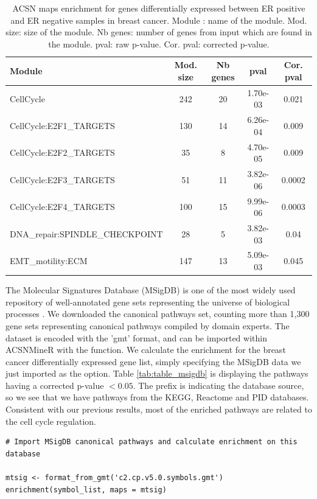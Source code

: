 \documentclass[article]{jss}
\begin{document}
\begin{table}[h!]
  \centering
  \caption{ACSN maps enrichment for genes differentially expressed between ER
positive and ER negative samples in breast cancer.  Module : name of the
module. Mod. size: size of the module. Nb genes: number of genes from input
which are found in the module. pval: raw p-value. Cor. pval: corrected p-value.}
\label{tab:table_mainz}

\begin{tabular}{l|c|c|c|c}
\hline
Module & Mod. size & Nb genes & pval & Cor. pval\\
\hline
CellCycle & 242 & 20 & 1.70e-03 & 0.021 \\
CellCycle:E2F1\_TARGETS & 130 & 14 & 6.26e-04 & 0.009 \\
CellCycle:E2F2\_TARGETS & 35 & 8 & 4.70e-05 & 0.009 \\
CellCycle:E2F3\_TARGETS & 51 & 11 & 3.82e-06 & 0.0002 \\
CellCycle:E2F4\_TARGETS & 100 & 15 & 9.99e-06 & 0.0003 \\
DNA\_repair:SPINDLE\_CHECKPOINT & 28 & 5 & 3.82e-03 & 0.04 \\
EMT\_motility:ECM & 147 & 13 & 5.09e-03 & 0.045 \\
\hline
\end{tabular}
\end{table}

The Molecular Signatures Database (MSigDB) is one of the most widely used
repository of well-annotated  gene sets representing the universe of biological
processes \citep{liberzon2011molecular}. We downloaded the canonical pathways
set, counting more than 1,300 gene sets representing canonical pathways compiled
by domain experts. The dataset is encoded with the 'gmt' format, and can be
imported within ACSNMineR with the  function. We
calculate the enrichment for the breast cancer differentially expressed gene
list, simply specifying the MSigDB data we just imported as the 
option. Table \ref{tab:table_msigdb} is displaying the pathways having a
corrected p-value $< 0.05$. The prefix is indicating the database source, so we
see that we have pathways from the KEGG, Reactome and PID databases. Consistent
with our previous results, most of the enriched pathways are related to the cell
cycle regulation. 


\begin{verbatim}
# Import MSigDB canonical pathways and calculate enrichment on this database 

mtsig <- format_from_gmt('c2.cp.v5.0.symbols.gmt')
enrichment(symbol_list, maps = mtsig)

\end{verbatim}
\end{document}
